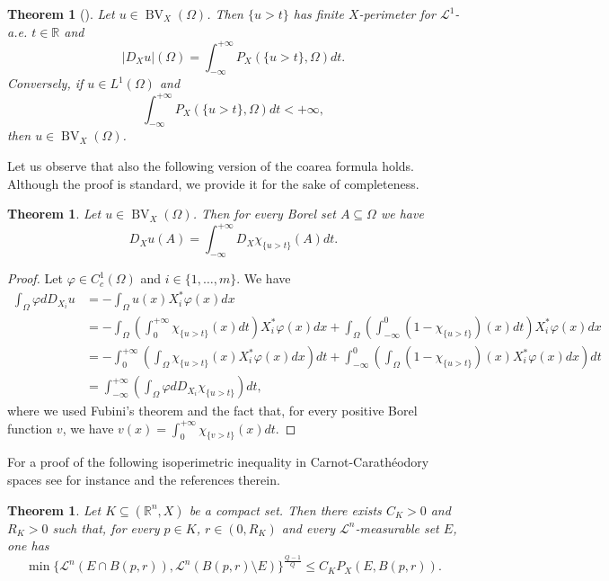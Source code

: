 \documentclass[12pt,a4paper]{amsart}
\theoremstyle{definition}
\theoremstyle{plain}
\newtheorem{teo}[defi]{Theorem}
\newcommand{\vp}{\varphi}
\newcommand{\R}{\mathbb{R}}
\newcommand{\se}{\subseteq}
\newcommand{\leb}{\mathcal{L}}
\newcommand{\bv}{\operatorname{BV}}
\begin{document}
\begin{teo}[{\cite[Theorem 2.3.5]{fssc}}]\label{teo_coarea1}
Let $u \in \bv_X(\Omega)$. Then $\{u>t\}$ has finite $X$-perimeter for $\leb^1$-a.e. $t \in \R$ and
\[
|D_Xu|(\Omega)=\int_{-\infty}^{+\infty} P_X(\{u >t\},\Omega)dt.
\]
Conversely, if $u \in L^1(\Omega)$ and 
\[
\int_{-\infty}^{+\infty} P_X(\{u >t\},\Omega)dt<+\infty,
\]
then $u \in \bv_X(\Omega)$.
\end{teo}
Let us observe that also the following version of the coarea formula holds. Although the proof is standard, we provide it for the sake of completeness.
\begin{teo}\label{teo_coarea2}
    Let $u \in \bv_X(\Omega)$. Then for every Borel set $A \se \Omega$ we have
\[
D_Xu(A)=\int_{-\infty}^{+\infty} D_X \chi_{\{u >t\}}(A) dt.
\]
\end{teo}
\begin{proof}
    Let $\vp \in C^1_c(\Omega)$ and $i \in \{1,\dots,m\}$. We have
    \begin{align*}
        \int_\Omega \vp dD_{X_i}u&=-\int_\Omega u(x)X^*_i\vp(x)dx\\
        &=-\int_\Omega \left( \int_0^{+\infty} \chi_{\{u>t\}}(x)dt \right)X^*_i\vp(x)dx+\int_\Omega \left( \int_{-\infty}^0 (1- \chi_{\{u>t\}})(x)dt \right)X^*_i\vp(x)dx \\
        &=-\int_0^{+\infty} \left( \int_\Omega \chi_{\{u>t\}}(x)X^*_i\vp(x)dx \right)dt+\int_{-\infty}^0 \left(\int_\Omega  (1- \chi_{\{u>t\}})(x)X^*_i\vp(x)dx \right)dt\\
        &= \int_{-\infty}^{+\infty} \left( \int_\Omega \vp dD_{X_i} \chi_{\{ u>t \} } \right)dt,
    \end{align*}
    where we used Fubini's theorem and the fact that, for every positive Borel function $v$, we have $v(x)=\int_0^{+\infty} \chi_{ \{ v>t \} }(x)dt$.
\end{proof}



For a proof of the following isoperimetric inequality in Carnot-Carathéodory spaces see for instance \cite[Theorem 2.42]{dv} and the references therein.
\begin{teo}\label{teo_isoineq}
    Let $K \se (\R^n,X)$ be a compact set. Then there exists $C_K>0$ and $R_K>0$ such that, for every $p \in K$, $r \in (0,R_K)$ and every $\leb^n$-measurable set $E$, one has
    \[
    \min \{ \leb^n(E \cap B(p,r)),\leb^n(B(p,r) \setminus E)    \}^\frac{Q-1}{Q} \leq C_KP_X(E,B(p,r)).
    \]
\end{teo}
\end{document}
